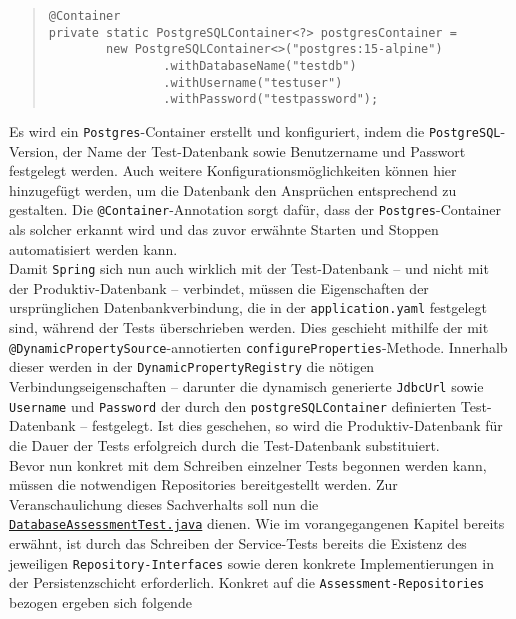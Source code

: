 \begin{quote}
\begin{verbatim}
@Container
private static PostgreSQLContainer<?> postgresContainer = 
        new PostgreSQLContainer<>("postgres:15-alpine")
                .withDatabaseName("testdb")
                .withUsername("testuser")
                .withPassword("testpassword");
\end{verbatim}
\end{quote}

Es wird ein \texttt{Postgres}-Container erstellt und konfiguriert, indem die 
\texttt{PostgreSQL}-Version, der Name der Test-Datenbank sowie Benutzername und 
Passwort festgelegt werden. Auch weitere Konfigurationsmöglichkeiten können hier 
hinzugefügt werden, um die Datenbank den Ansprüchen entsprechend zu gestalten. Die 
\texttt{@Container}-Annotation sorgt dafür, dass der \texttt{Postgres}-Container 
als solcher erkannt wird und das zuvor erwähnte Starten und Stoppen automatisiert 
werden kann. \\ 
Damit \texttt{Spring} sich nun auch wirklich mit der Test-Datenbank -- und nicht mit 
der Produktiv-Datenbank -- verbindet, müssen die Eigenschaften der ursprünglichen 
Datenbankverbindung, die in der \texttt{application.yaml} festgelegt sind, während 
der Tests überschrieben werden. Dies geschieht mithilfe der mit 
\texttt{@DynamicPropertySource}-annotierten \texttt{configureProperties}-Methode. 
Innerhalb dieser werden in der \texttt{DynamicPropertyRegistry} die nötigen 
Verbindungseigenschaften -- darunter die dynamisch generierte \texttt{JdbcUrl} sowie 
\texttt{Username} und \texttt{Password} der durch den \texttt{postgreSQLContainer} 
definierten Test-Datenbank -- festgelegt. Ist dies geschehen, so wird die 
Produktiv-Datenbank für die Dauer der Tests erfolgreich durch die Test-Datenbank 
substituiert. \\ 
Bevor nun konkret mit dem Schreiben einzelner Tests begonnen werden kann, müssen 
die notwendigen Repositories bereitgestellt werden. Zur Veranschaulichung dieses 
Sachverhalts soll nun die 
\href{https://github.com/FlorianOhmes/bat_spielzeitenplaner/blob/main/spielzeitenplaner/src/test/java/de/bathesis/spielzeitenplaner/database/DatabaseAssessmentTest.java}{\texttt{DatabaseAssessmentTest.java}}
dienen. Wie im vorangegangenen Kapitel bereits erwähnt, ist durch das Schreiben der 
Service-Tests bereits die Existenz des jeweiligen \texttt{Repository-Interfaces} 
sowie deren konkrete Implementierungen in der Persistenzschicht erforderlich. 
Konkret auf die \texttt{Assessment-Repositories} bezogen ergeben sich folgende 
